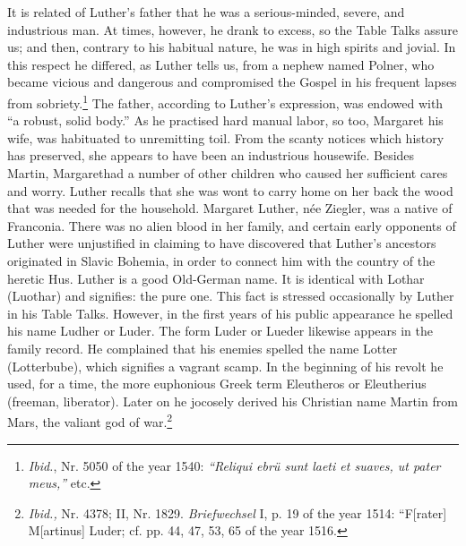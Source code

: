 It is related of Luther’s father that he was a serious-minded, severe,
and industrious man. At times, however, he drank to excess, so the
Table Talks assure us; and then, contrary to his habitual nature, he
was in high spirits and jovial. In this respect he differed, as Luther tells
us, from a nephew named Polner, who became vicious and dangerous
and compromised the Gospel in his frequent lapses from sobriety.\footnote{
    \textit{Ibid.}, Nr. 5050 of the year 1540: \textit{“Reliqui ebrü sunt laeti et suaves, ut pater meus,”} etc.}
The father, according to Luther’s expression, was endowed with
“a robust, solid body.” As he practised hard manual labor, so too,
Margaret his wife, was habituated to unremitting toil. From the scanty
notices which history has preserved, she appears to have been an industrious housewife. Besides Martin, Margarethad a number of other children who caused her sufficient cares and worry. Luther recalls that she
was wont to carry home on her back the wood that was needed for the
household. Margaret Luther, née Ziegler, was a native of Franconia.
There was no alien blood in her family, and certain early opponents
of Luther were unjustified in claiming to have discovered that
Luther’s ancestors originated in Slavic Bohemia, in order to connect
him with the country of the heretic Hus. Luther is a good Old-German name.
It is identical with Lothar (Luothar) and signifies: the
pure one. This fact is stressed occasionally by Luther in his Table
Talks. However, in the first years of his public appearance he spelled
his name Ludher or Luder. The form Luder or Lueder likewise appears in the family record. He complained that his enemies spelled the
name Lotter (Lotterbube), which signifies a vagrant scamp. In the
beginning of his revolt he used, for a time, the more euphonious
Greek term Eleutheros or Eleutherius (freeman, liberator). Later on
he jocosely derived his Christian name Martin from Mars, the valiant
god of war.\footnote{\textit{Ibid.,} Nr. 4378; II, Nr. 1829. \textit{Briefwechsel} I, p. 19 of the year 1514: “F[rater]
M[artinus] Luder; cf. pp. 44, 47, 53, 65 of the year 1516.
}

